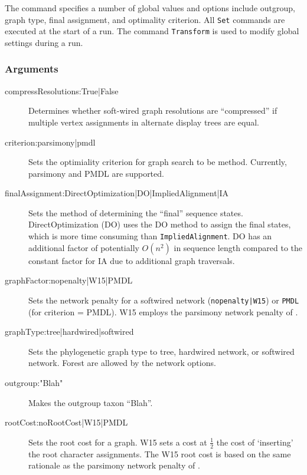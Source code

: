 	\begin{phygdescription}
		{The command specifies a number of global values and options include outgroup, 
		graph type, final assignment, and optimality criterion. All \texttt{Set} commands
		are executed at the start of a run. The command \texttt{Transform} is used to modify 
		global settings during a run.}
	\end{phygdescription}
			
	\subsubsection{Arguments}
		\begin{description}
			\item[compressResolutions:True|False] Determines whether soft-wired graph 
			resolutions are ``compressed'' if multiple vertex assignments in alternate display 
			trees are equal.
			
			\item[criterion:parsimony|pmdl] Sets the optimiality criterion for graph search to be 
			method. Currently, parsimony and PMDL \citep{WheelerandVaron2022} are supported.
			
			\item[finalAssignment:DirectOptimization|DO|ImpliedAlignment|IA] Sets the method 
			of determining the ``final'' sequence states. DirectOptimization (DO) uses the DO 
			method to assign the final states, which is more time consuming than \texttt{ImpliedAlignment}. 
			DO has an additional factor of potentially $O(n^2)$ in sequence length compared 
			to the constant factor for IA due to additional graph traversals.
			
			\item[graphFactor:nopenalty|W15|PMDL] Sets the network penalty for a softwired network 
			(\texttt{nopenalty|W15}) or \texttt{PMDL} (for criterion = PMDL). W15 employs the
			parsimony network penalty of \cite{Wheeler2015}.
			
			\item[graphType:tree|hardwired|softwired] Sets the phylogenetic graph type to tree, 
			hardwired network, or softwired network. Forest are allowed by the network options.
			
			\item[outgroup:"Blah"] Makes the outgroup taxon ``Blah''. 
			
			\item[rootCost:noRootCost|W15|PMDL] Sets the root cost for a graph. W15 sets a 
			cost at $\frac{1}{2}$ the cost of `inserting' the root character assignments. 
			The W15 root cost is based on the same rationale as the parsimony network penalty of
			 \cite{Wheeler2015}.
		\end{description}
					
